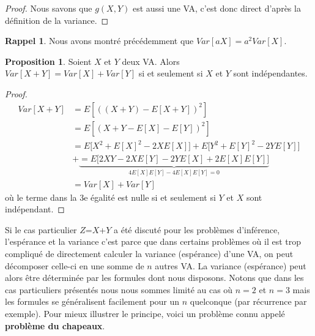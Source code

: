 \documentclass[a4paper,12pt]{report}
\theoremstyle{definition}
\renewcommand{\(}{\left(}
\renewcommand{\)}{\right)}
\renewcommand{\b}{\textbf}
\newtheorem{prop}[thm]{Proposition}
\newtheorem{rap}[thm]{Rappel}
\begin{document}
            \begin{proof}
                Nous savons que $g(X,Y)$ est aussi une VA, c'est donc direct d'après la définition de la variance.
            \end{proof}
            
            \begin{rap}
                Nous avons montré précédemment que $Var[aX] = a^2Var[X]$.
            \end{rap}
            
            \begin{leftbar}
            \begin{prop}
                Soient $X$ et $Y$ deux VA. Alors $Var[X+Y] = Var[X]+Var[Y]$ si et seulement si $X$ et $Y$ sont indépendantes.
            \end{prop}
            \end{leftbar}
            
            \begin{proof}
                \begin{align*}
                    Var[X+Y] &= E[((X+Y)-E[X+Y])^2] \\
                    &= E[(X+Y-E[X]-E[Y])^2] \\
                    &= E\big[X^2+E[X]^2-2XE[X]\big] + E\big[Y^2+E[Y]^2-2YE[Y]\big] \\
                    &+ \underbrace{=E\big[2XY-2XE[Y]-2YE[X]+2E[X]E[Y]\big]}_{4E[X]E[Y] - 4E[X]E[Y]=0} \\
                    &= Var[X] + Var[Y]
                \end{align*}
                où le terme dans la 3e égalité est nulle si et seulement si $Y$ et $X$ sont indépendant.
            \end{proof}
            
            Si le cas particulier $Z$=$X$+$Y$ a été discuté pour les problèmes d'inférence, l'espérance et la variance
            c'est parce que dans certains problèmes où il est trop compliqué de directement calculer la variance (espérance)
            d'une VA, on peut décomposer celle-ci en une somme de $n$ autres VA. La variance (espérance) peut alors être déterminée
            par les formules dont nous disposons. Notons que dans les cas particuliers présentés nous nous sommes limité au cas où $n=2$ et
            $n=3$ mais les formules se généralisent facilement pour un $n$ quelconque (par récurrence par exemple). Pour mieux illustrer
            le principe, voici un problème connu appelé \b{problème du chapeaux}.
            
\end{document}
